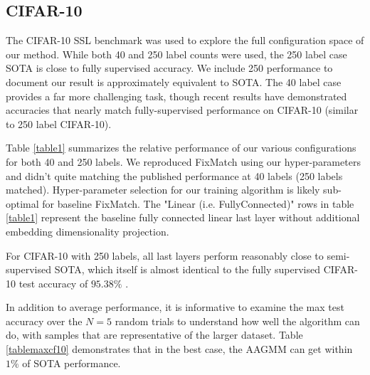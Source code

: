 \documentclass[10pt,twocolumn,letterpaper]{article}
\begin{document}
\subsection{CIFAR-10}


The CIFAR-10 SSL benchmark was used to explore the full configuration space of our method.
While both 40 and 250 label counts were used, the 250 label case SOTA is close to fully supervised accuracy.
We include 250 performance to document our result is approximately equivalent to SOTA. 
The 40 label case provides a far more challenging task, though recent results have demonstrated accuracies that nearly match fully-supervised performance on CIFAR-10 (similar to 250 label CIFAR-10).

Table \ref{table1} summarizes the relative performance of our various configurations for both 40 and 250 labels.
We reproduced FixMatch \cite{sohn2020fixmatch} using our hyper-parameters and didn't quite matching the published performance at 40 labels (250 labels matched). 
Hyper-parameter selection for our training algorithm is likely sub-optimal for baseline FixMatch.
The "Linear (i.e. FullyConnected)" rows in table \ref{table1} represent the baseline fully connected linear last layer without additional embedding dimensionality projection.

For CIFAR-10 with 250 labels, all last layers perform reasonably close to semi-supervised SOTA, which itself is almost identical to the fully supervised CIFAR-10 test accuracy of $95.38\%$ \cite{wang2022freematch}. 

In addition to average performance, it is informative to examine the max test accuracy over the $N=5$ random trials to understand how well the algorithm can do, with samples that are representative of the larger dataset.
Table \ref{tablemaxcf10} demonstrates that in the best case, the AAGMM can get within $1\%$ of SOTA \cite{zheng2023simmatchv2} performance. 
\end{document}
